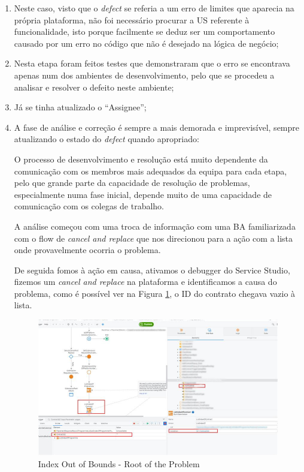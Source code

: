                 \begin{enumerate}
                    \item Neste caso, visto que o \textit{defect} se referia a um erro de limites que aparecia na própria plataforma, não foi necessário procurar a US referente à funcionalidade, isto porque facilmente se deduz ser um comportamento causado por um erro no código que não é desejado na lógica de negócio;

                    \item Nesta etapa foram feitos testes que demonstraram que o erro se encontrava apenas num dos ambientes de desenvolvimento, pelo que se procedeu a analisar e resolver o defeito neste ambiente;

                    \item Já se tinha atualizado o ``Assignee'';

                    \item A fase de análise e correção é sempre a mais demorada e imprevisível, sempre atualizando o estado do \textit{defect} quando apropriado:
                    
                    O processo de desenvolvimento e resolução está muito dependente da comunicação com os membros mais adequados da equipa para cada etapa, pelo que grande parte da capacidade de resolução de problemas, especialmente numa fase inicial, depende muito de uma capacidade de comunicação com os colegas de trabalho. 

                    A análise começou com uma troca de informação com uma BA familiarizada com o flow de \textit{cancel and replace} que nos direcionou para a ação com a lista onde provavelmente ocorria o problema.

                    De seguida fomos à ação em causa, ativamos o debugger do Service Studio, fizemos um \textit{cancel and replace} na plataforma e identificamos a causa do problema, como é possível ver na Figura \ref{fig:index_out_of_bounds1}, o ID do contrato chegava vazio à lista. 

                    \begin{figure}[H]
                        \centering
                        \includegraphics[width=\textwidth]{imgs/IndexOutOfBounds1.jpg}
                        \caption{Index Out of Bounds - Root of the Problem}\label{fig:index_out_of_bounds1}
                    \end{figure}


\end{enumerate}
